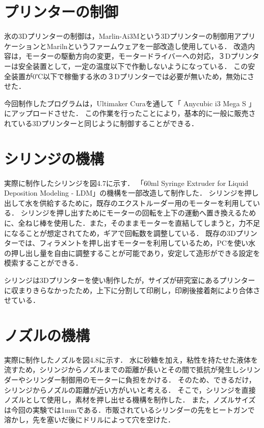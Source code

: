 \section{プリンターの制御}
\label{sec:paragraph}
氷の3Dプリンターの制御は，Marlin-Ai3Mという3Dプリンターの制御用アプリケーションとMarilnというファームウェアを一部改造し使用している．
改造内容は，モーターの駆動方向の変更，モータードライバーへの対応，３Dプリンターは安全装置として，一定の温度以下で作動しないようになっている．
この安全装置が0℃以下で稼働する氷の３Dプリンターでは必要が無いため，無効にさせた．

今回制作したプログラムは，Ultimaker Curaを通して「 Anycubic i3 Mega S 」にアップロードさせた．
この作業を行ったことにより，基本的に一般に販売されている3Dプリンターと同じように制御することができる．

\section{シリンジの機構}
\label{sec:paragraph}
実際に制作したシリンジを図4.7に示す．
「60ml Syringe Extruder for Liquid Deposition Modeling - LDM」の機構を一部改造して制作した\cite{abc}．
シリンジを押し出して水を供給するために，既存のエクストルーダー用のモーターを利用している．
シリンジを押し出すためにモーターの回転を上下の運動へ置き換えるために、全ねじ棒を使用した．また，そのままモーターを直結してしまうと，力不足になることが想定されてため，ギアで回転数を調整している．
既存の3Dプリンターでは、フィラメントを押し出すモーターを利用しているため，PCを使い水の押し出し量を自由に調整することが可能であり，安定して造形ができる設定を模索することができる．

シリンジは3Dプリンターを使い制作したが，サイズが研究室にあるプリンターに収まりきらなかったため，上下に分割して印刷し，印刷後接着剤により合体させている．

\section{ノズルの機構}
\label{sec:paragraph}
実際に制作したノズルを図4.8に示す．
水に砂糖を加え，粘性を持たせた液体を流すため，シリンジからノズルまでの距離が長いとその間で抵抗が発生しシリンダーやシリンダー制御用のモーターに負担をかける．
そのため、できるだけ，シリンジからノズルの距離が近い方がいいと考える．
そこで，シリンジを直接ノズルとして使用し，素材を押し出せる機構を制作した．
また，ノズルサイズは今回の実験では1mmである．市販されているシリンダーの先をヒートガンで溶かし，先を塞いだ後にドリルによって穴を空けた．

